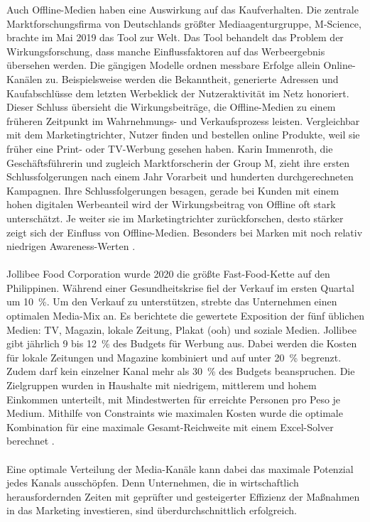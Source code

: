 Auch Offline-Medien haben eine Auswirkung auf das Kaufverhalten. Die zentrale Marktforschungsfirma von Deutschlands größter Mediaagenturgruppe, M-Science, brachte im Mai 2019 das Tool  zur Welt. Das Tool behandelt das Problem der Wirkungsforschung, dass manche Einflussfaktoren auf das Werbeergebnis übersehen werden. Die gängigen Modelle ordnen messbare Erfolge allein Online-Kanälen zu. Beispielsweise werden die Bekanntheit, generierte Adressen und Kaufabschlüsse dem letzten Werbeklick der Nutzeraktivität im Netz honoriert. Dieser Schluss übersieht die Wirkungsbeiträge, die Offline-Medien zu einem früheren Zeitpunkt im Wahrnehmungs- und Verkaufsprozess leisten. Vergleichbar mit dem Marketingtrichter, Nutzer finden und bestellen online Produkte, weil sie früher eine Print- oder TV-Werbung gesehen haben. Karin Immenroth, die Geschäftsführerin und zugleich Marktforscherin der Group M, zieht ihre ersten Schlussfolgerungen nach einem Jahr Vorarbeit und hunderten durchgerechneten Kampagnen. Ihre Schlussfolgerungen besagen, gerade bei Kunden mit einem hohen digitalen Werbeanteil wird der Wirkungsbeitrag von Offline oft stark unterschätzt. Je weiter sie im Marketingtrichter zurückforschen, desto stärker zeigt sich der Einfluss von Offline-Medien. Besonders bei Marken mit noch relativ niedrigen Awareness-Werten \cite[S. 4]{20190411492848}.
\\\\
Jollibee Food Corporation wurde 2020 die größte Fast-Food-Kette auf den Philippinen. Während einer Gesundheitskrise fiel der Verkauf im ersten Quartal um 10~\%. Um den Verkauf zu unterstützen, strebte das Unternehmen einen optimalen Media-Mix an. Es berichtete die gewertete Exposition der fünf üblichen Medien: TV, Magazin, lokale Zeitung, Plakat (\ac{ooh}) und soziale Medien. Jollibee gibt jährlich 9 bis 12~\% des Budgets für Werbung aus. Dabei werden die Kosten für lokale Zeitungen und Magazine kombiniert und auf unter 20~\% begrenzt. Zudem darf kein einzelner Kanal mehr als 30~\% des Budgets beanspruchen. Die Zielgruppen wurden in Haushalte mit niedrigem, mittlerem und hohem Einkommen unterteilt, mit Mindestwerten für erreichte Personen pro Peso je Medium. Mithilfe von Constraints wie maximalen Kosten wurde die optimale Kombination für eine maximale Gesamt-Reichweite mit einem Excel-Solver berechnet \cite{Tapiceria2020}. \\\\
Eine optimale Verteilung der Media-Kanäle kann dabei das maximale Potenzial jedes Kanals ausschöpfen. Denn Unternehmen, die in wirtschaftlich herausfordernden Zeiten mit geprüfter und gesteigerter Effizienz der Maßnahmen in das Marketing investieren, sind überdurchschnittlich erfolgreich\cite{237097}. \\\\ 
